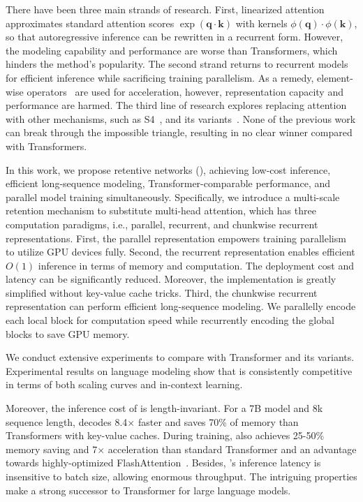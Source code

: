 There have been three main strands of research. First, linearized attention~\cite{linear-transformer} approximates standard attention scores $\exp({\bm{q}} \cdot {\bm{k}})$ with kernels $\phi({\bm{q}}) \cdot \phi({\bm{k}})$, so that autoregressive inference can be rewritten in a recurrent form. However, the modeling capability and performance are worse than Transformers, which hinders the method's popularity. The second strand returns to recurrent models for efficient inference while sacrificing training parallelism. As a remedy, element-wise operators~\cite{rwkv} are used for acceleration, however, representation capacity and performance are harmed. The third line of research explores replacing attention with other mechanisms, such as S4~\cite{s4}, and its variants~\cite{h3,hyena}. None of the previous work can break through the impossible triangle, resulting in no clear winner compared with Transformers.

In this work, we propose retentive networks (\our{}), achieving low-cost inference, efficient long-sequence modeling, Transformer-comparable performance, and parallel model training simultaneously. Specifically, we introduce a multi-scale retention mechanism to substitute multi-head attention, which has three computation paradigms, i.e., parallel, recurrent, and chunkwise recurrent representations. First, the parallel representation empowers training parallelism to utilize GPU devices fully. Second, the recurrent representation enables efficient $O(1)$ inference in terms of memory and computation. The deployment cost and latency can be significantly reduced. Moreover, the implementation is greatly simplified without key-value cache tricks. Third, the chunkwise recurrent representation can perform efficient long-sequence modeling. We parallelly encode each local block for computation speed while recurrently encoding the global blocks to save GPU memory.

We conduct extensive experiments to compare \our{} with Transformer and its variants. Experimental results on language modeling show that \our{} is consistently competitive in terms of both scaling curves and in-context learning.

Moreover, the inference cost of \our{} is length-invariant. For a 7B model and 8k sequence length, \our{} decodes 8.4$\times$ faster and saves 70\% of memory than Transformers with key-value caches. During training, \our{} also achieves 25-50\% memory saving and 7$\times$ acceleration than standard Transformer and an advantage towards highly-optimized FlashAttention~\cite{flashattention}. Besides, \our{}'s inference latency is insensitive to batch size, allowing enormous throughput. The intriguing properties make \our{} a strong successor to Transformer for large language models.

